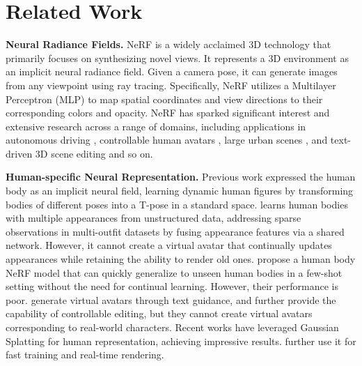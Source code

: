 \section{Related Work}
\label{sec:related}
\noindent\textbf{Neural Radiance Fields.}
NeRF \cite{nerf} is a widely acclaimed 3D technology that primarily focuses on synthesizing novel views. It represents a 3D environment as an implicit neural radiance field. Given a camera pose, it can generate images from any viewpoint using ray tracing. Specifically, NeRF \cite{nerf} utilizes a Multilayer Perceptron (MLP) \cite{multilayer} to map spatial coordinates and view directions to their corresponding colors and opacity. NeRF has sparked significant interest and extensive research across a range of domains, including applications in autonomous driving \cite{hu2024pc,chen2024s,cheng2023uc,feldmann2024nerfmentation}, controllable human avatars \cite{humannerf,personnerf,neuralbody,sun2022human,jiang2022neuman}, large urban scenes \cite{wang2023neural,xu2023grid,turki2023suds}, and text-driven 3D scene editing \cite{bao2023sine} and so on.

\noindent\textbf{Human-specific Neural Representation.}
Previous work \cite{humannerf,personnerf,zhao2022humannerf,hu2024gauhuman,hu2024gaussianavatar,neuralbody} expressed the human body as an implicit neural field, learning dynamic human figures by transforming bodies of different poses into a T-pose in a standard space. 
\cite{personnerf} learns human bodies with multiple appearances from unstructured data, addressing sparse observations in multi-outfit datasets by fusing appearance features via a shared network. However, it cannot create a virtual avatar that continually updates appearances while retaining the ability to render old ones. \cite{actorsnerf,mps,sherf,pan2023transhuman,kwon2023neural,zhao2022humannerf} propose a human body NeRF model that can quickly generalize to unseen human bodies in a few-shot setting without the need for continual learning. However, their performance is poor. 
\cite{liu2024humangaussian,kolotouros2024dreamhuman} generate virtual avatars through text guidance, and \cite{zhang2023text,mendiratta2023avatarstudio} further provide the capability of controllable editing, but they cannot create virtual avatars corresponding to real-world characters.
Recent works have leveraged Gaussian Splatting \cite{wu20234d,chen2023text,kerbl20233d,tang2023dreamgaussian} for human representation, achieving impressive results. \cite{hu2024gauhuman,qian20243dgs,hu2024gaussianavatar} further use it for fast training and real-time rendering.

